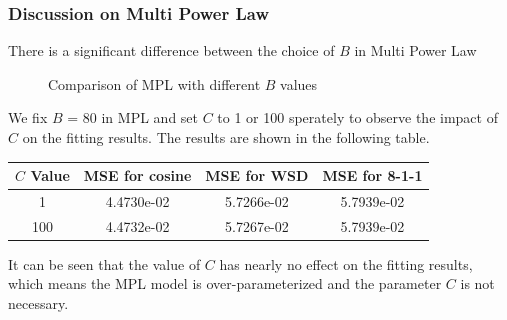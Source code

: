\documentclass[aspectratio=169]{beamer}
\begin{document}
\begin{frame}
    \frametitle{Discussion on Multi Power Law}
    There is a significant difference between the choice of $B$ in
    Multi Power Law
    \begin{figure}
        \centering
        \caption{Comparison of MPL with different $B$ values}
    \end{figure}
\end{frame}

\begin{frame}
    We fix $B$ = 80 in MPL and set $C$ to 1 or 100 sperately to observe the
    impact of $C$ on the fitting results. The results are shown in
    the following table.
    \begin{table}
        \centering
        \begin{tabular}{cccc}
            \toprule
            $C$ Value & MSE for cosine & MSE for WSD & MSE for 8-1-1 \\
            \midrule
            1 & 4.4730e-02 & 5.7266e-02 & 5.7939e-02 \\
            100 & 4.4732e-02 & 5.7267e-02 & 5.7939e-02 \\
            \bottomrule
        \end{tabular}
    \end{table}

    It can be seen that the value of $C$ has nearly no effect on the
    fitting results, which means the MPL model is over-parameterized
    and the parameter $C$ is not necessary.
\end{frame}
\end{document}
